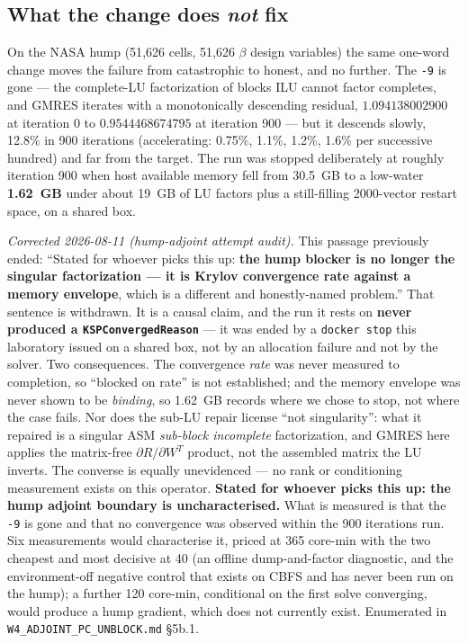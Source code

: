 \documentclass[11pt,a4paper]{article}
\begin{document}
\subsection{What the change does \emph{not} fix}

On the NASA hump (51{,}626 cells, 51{,}626 \(\beta\) design variables) the same one-word
change moves the failure from catastrophic to honest, and no further. The
\texttt{-9} is gone --- the complete-LU factorization of blocks ILU cannot factor completes,
and GMRES iterates with a monotonically descending residual, \(1.094138002900\) at iteration 0
to \(0.9544468674795\) at iteration 900 --- but it descends slowly, 12.8\% in 900 iterations
(accelerating: 0.75\%, 1.1\%, 1.2\%, 1.6\% per successive hundred) and far from the target.
The run was stopped deliberately at roughly iteration 900 when host available memory fell from
30.5~GB to a low-water \textbf{1.62~GB} under about 19~GB of LU factors plus a still-filling
2000-vector restart space, on a shared box.

\emph{Corrected 2026-08-11 (hump-adjoint attempt audit).} This passage previously ended:
``Stated for whoever picks this up: \textbf{the hump blocker is no longer the singular
factorization --- it is Krylov convergence rate against a memory envelope}, which is a
different and honestly-named problem.'' That sentence is withdrawn. It is a causal claim,
and the run it rests on \textbf{never produced a \texttt{KSPConvergedReason}} --- it was
ended by a \texttt{docker stop} this laboratory issued on a shared box, not by an allocation
failure and not by the solver. Two consequences. The convergence \emph{rate} was never
measured to completion, so ``blocked on rate'' is not established; and the memory envelope
was never shown to be \emph{binding}, so 1.62~GB records where we chose to stop, not where
the case fails. Nor does the sub-LU repair license ``not singularity'': what it repaired is a
singular ASM \emph{sub-block incomplete} factorization, and GMRES here applies the
matrix-free \(\partial R/\partial W^{T}\) product, not the assembled matrix the LU inverts.
The converse is equally unevidenced --- no rank or conditioning measurement exists on this
operator. \textbf{Stated for whoever picks this up: the hump adjoint boundary is
uncharacterised.} What is measured is that the \texttt{-9} is gone and that no convergence
was observed within the 900 iterations run. Six measurements would characterise it, priced at
365 core-min with the two cheapest and most decisive at 40 (an offline dump-and-factor
diagnostic, and the environment-off negative control that exists on CBFS and has never been
run on the hump); a further 120 core-min, conditional on the first solve converging, would
produce a hump gradient, which does not currently exist. Enumerated in
\texttt{W4\_ADJOINT\_PC\_UNBLOCK.md} \S5b.1.
\end{document}
